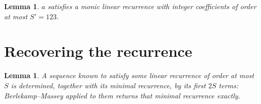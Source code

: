 \documentclass[11pt,a4paper]{article}
\theoremstyle{plain}
\newtheorem{lemma}[theorem]{Lemma}
\theoremstyle{definition}
\begin{document}
\begin{lemma}\label{lem:cf}
$a$ satisfies a monic linear recurrence with integer coefficients of order at most
$S'=123$.
\end{lemma}

\section{Recovering the recurrence}

\begin{lemma}\label{lem:bm}
A sequence known to satisfy some linear recurrence of order at most $S$ is determined, together
with its minimal recurrence, by its first $2S$ terms: Berlekamp--Massey applied to them returns
that minimal recurrence exactly.
\end{lemma}
\end{document}
